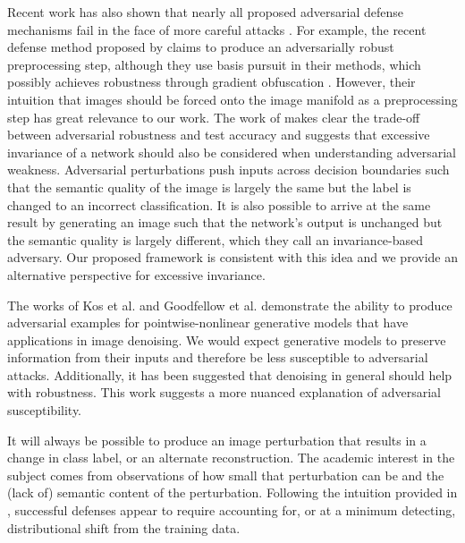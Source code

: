 Recent work has also shown that nearly all proposed adversarial defense mechanisms fail in the face of more careful attacks \parencite{carlini2017towards, athalye2018obfuscated}.
For example, the recent defense method proposed by \cite{sun2018adversarial} claims to produce an adversarially robust preprocessing step, although they use basis pursuit in their methods, which possibly achieves robustness through gradient obfuscation \parencite{athalye2018obfuscated}.
However, their intuition that images should be forced onto the image manifold as a preprocessing step has great relevance to our work.
The work of \cite{jacobsen2018excessive} makes clear the trade-off between adversarial robustness and test accuracy and suggests that excessive invariance of a network should also be considered when understanding adversarial weakness.
Adversarial perturbations push inputs across decision boundaries such that the semantic quality of the image is largely the same but the label is changed to an incorrect classification.
It is also possible to arrive at the same result by generating an image such that the network's output is unchanged but the semantic quality is largely different, which they call an invariance-based adversary.
Our proposed framework is consistent with this idea and we provide an alternative perspective for excessive invariance.

The works of Kos et al. \citeyearpar{kos2018adversarial} and Goodfellow et al. \citeyearpar{goodfellow2014explaining} demonstrate the ability to produce adversarial examples for pointwise-nonlinear generative models that have applications in image denoising.
We would expect generative models to preserve information from their inputs and therefore be less susceptible to adversarial attacks.
Additionally, it has been suggested that denoising in general should help with robustness.
This work suggests a more nuanced explanation of adversarial susceptibility.

It will always be possible to produce an image perturbation that results in a change in class label, or an alternate reconstruction.
The academic interest in the subject comes from observations of how small that perturbation can be and the (lack of) semantic content of the perturbation.
Following the intuition provided in \parencite{ford2019adversarial}, successful defenses appear to require accounting for, or at a minimum detecting, distributional shift from the training data.



